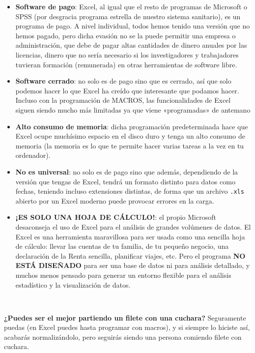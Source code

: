 \documentclass[11pt,]{book}
\begin{document}
\begin{itemize}
\item
  \textbf{Software de pago}: Excel, al igual que el resto de programas de Microsoft o SPSS (por desgracia programa estrella de nuestro sistema sanitario), es un programa de pago. A nivel individual, todos hemos tenido una versión que no hemos pagado, pero dicha evasión no se la puede permitir una empresa o administración, que debe de pagar altas cantidades de dinero anuales por las licencias, dinero que no sería necesario si los investigadores y trabajadores tuvieran formación (remunerada) en otras herramientas de software libre.
\item
  \textbf{Software cerrado}: no solo es de pago sino que es cerrado, así que solo podemos hacer lo que Excel ha creído que interesante que podamos hacer. Incluso con la programación de MACROS, las funcionalidades de Excel siguen siendo mucho más limitadas ya que viene «programadas» de antemano
\item
  \textbf{Alto consumo de memoria}: dicha programación predeterminada hace que Excel ocupe muchísimo espacio en el disco duro y tenga un alto consumo de memoria (la memoria es lo que te permite hacer varias tareas a la vez en tu ordenador).
\item
  \textbf{No es universal}: no solo es de pago sino que además, dependiendo de la versión que tengas de Excel, tendrá un formato distinto para datos como fechas, teniendo incluso extensiones distintas, de forma que un archivo \texttt{.xls} abierto por un Excel moderno puede provocar errores en la carga.
\item
  \textbf{¡ES SOLO UNA HOJA DE CÁLCULO!}: el propio Microsoft desaconseja el uso de Excel para el análisis de grandes volúmenes de datos. El Excel es una herramienta maravillosa para ser usada como una sencilla hoja de cálculo: llevar las cuentas de tu familia, de tu pequeño negocio, una declaración de la Renta sencilla, planificar viajes, etc. Pero el programa \textbf{NO ESTÁ DISEÑADO} para ser una base de datos ni para análisis detallado, y muchos menos pensado para generar un entorno flexible para el análisis estadístico y la visualización de datos.
\end{itemize}

~

\textbf{¿Puedes ser el mejor partiendo un filete con una cuchara?} Seguramente puedas (en Excel puedes hasta programar con macros), y si siempre lo hiciste así, acabarás normalizándolo, pero seguirás siendo una persona comiendo filete con cuchara.
\end{document}
